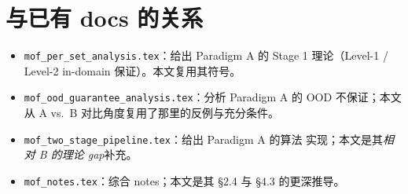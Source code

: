 \documentclass[11pt,a4paper]{article}
\theoremstyle{definition}
\begin{document}
\section{与已有 docs 的关系}
\label{app:relation}

\begin{itemize}[leftmargin=1.5em]
\item \texttt{mof\_per\_set\_analysis.tex}：给出 Paradigm A 的 Stage 1
理论（Level-1 / Level-2 in-domain 保证）。本文复用其符号。
\item \texttt{mof\_ood\_guarantee\_analysis.tex}：分析 Paradigm A 的 OOD
不保证；本文从 A vs.\ B 对比角度复用了那里的反例与充分条件。
\item \texttt{mof\_two\_stage\_pipeline.tex}：给出 Paradigm A 的算法
实现；本文是其\emph{相对 B 的理论 gap}补充。
\item \texttt{mof\_notes.tex}：综合 notes；本文是其 \S 2.4 与 \S 4.3
的更深推导。
\end{itemize}
\end{document}
